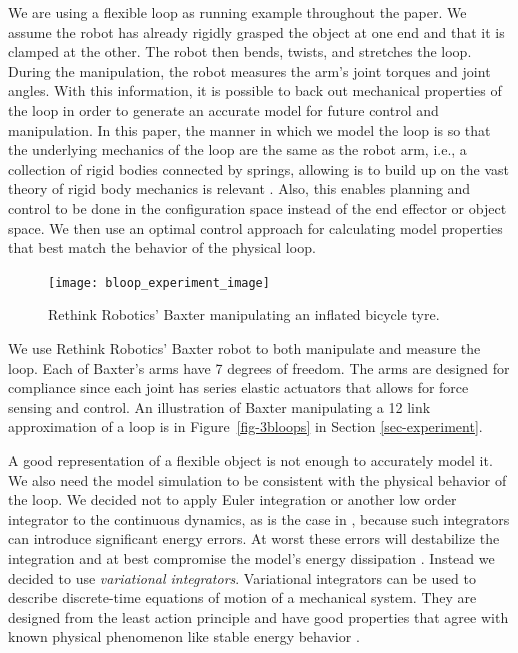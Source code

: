 \documentclass[letterpaper, 10pt, conference]{ieeeconf}
\begin{document}
We are using a flexible loop as running example throughout the paper.  We assume the robot has already rigidly grasped the object at one end and that it is clamped at the other.  The robot then bends, twists, and stretches the loop.  During the manipulation, the robot measures the arm's joint torques and joint angles.  With this information, it is possible to back out mechanical properties of the loop in order to generate an accurate model for future control and manipulation.  In this paper, the manner in which we model the loop is so that the underlying mechanics of the loop are the same as the robot arm, i.e., a collection of rigid bodies connected by springs, allowing is to build up on 
the vast theory of rigid body mechanics is relevant \cite{murray_li_sastry}. Also,  this enables planning and control to be done in the configuration space instead of the end effector or object space.  We then use an optimal control approach for calculating model properties that best match the behavior of the physical loop.



\begin{figure}
\centering
\texttt{[image: bloop\_experiment\_image]}
\caption{Rethink Robotics' Baxter manipulating an inflated bicycle tyre.}
\label{fig-baxter_image_1}
\end{figure}

We use Rethink Robotics' Baxter \cite{guizzo2011rethink} robot to both manipulate and measure the loop.  Each of Baxter's arms have 7 degrees of freedom.  The arms are designed for compliance since each joint has series elastic actuators that allows for force sensing and control.  An illustration of Baxter manipulating a 12 link approximation of a loop is in Figure~\ref{fig-3bloops} in Section \ref{sec-experiment}.

A good representation of a flexible object is not enough to accurately model it.  We also need the model simulation to be consistent with the physical behavior of the loop.  We decided not to apply Euler integration or another low order integrator to the continuous dynamics, as is the case in \cite{sahari_etal}, because such integrators can introduce significant energy errors.  At worst these errors will destabilize the integration and at best compromise the model's energy dissipation \cite{johnson_murphey_scalable}.  Instead we decided to use \emph{variational integrators}.  Variational integrators can be used to describe discrete-time equations of motion of a mechanical system.  They are designed from the least action principle and have good properties that agree with known physical phenomenon like stable energy behavior \cite{pekarek_murphey}.
\end{document}

